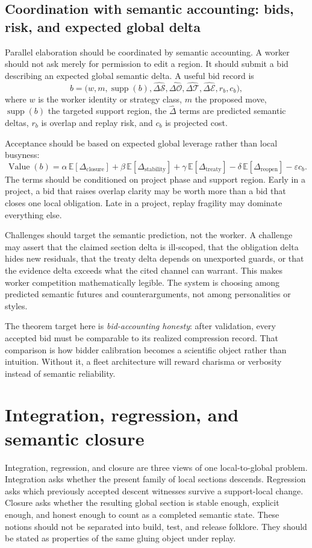 \documentclass[11pt]{report}
\begin{document}
\section{Coordination with semantic accounting: bids, risk, and expected global delta}
Parallel elaboration should be coordinated by semantic accounting. A worker should not ask merely for permission to edit a region. It should submit a bid describing an expected global semantic delta. A useful bid record is
\[
b
=
\bigl(
w,
m,
\operatorname{supp}(b),
\widehat{\Delta \mathcal{S}},
\widehat{\Delta \mathcal{O}},
\widehat{\Delta \mathcal{T}},
\widehat{\Delta \mathcal{E}},
r_b,
c_b
\bigr),
\]
where $w$ is the worker identity or strategy class, $m$ the proposed move, $\operatorname{supp}(b)$ the targeted support region, the $\widehat{\Delta}$ terms are predicted semantic deltas, $r_b$ is overlap and replay risk, and $c_b$ is projected cost.

Acceptance should be based on expected global leverage rather than local busyness:
\[
\operatorname{Value}(b)
=
\alpha \,\mathbb{E}[\Delta_{\mathrm{closure}}]
+
\beta \,\mathbb{E}[\Delta_{\mathrm{stability}}]
+
\gamma \,\mathbb{E}[\Delta_{\mathrm{treaty}}]
-
\delta \,\mathbb{E}[\Delta_{\mathrm{reopen}}]
-
\varepsilon c_b.
\]
The terms should be conditioned on project phase and support region. Early in a project, a bid that raises overlap clarity may be worth more than a bid that closes one local obligation. Late in a project, replay fragility may dominate everything else.

Challenges should target the semantic prediction, not the worker. A challenge may assert that the claimed section delta is ill-scoped, that the obligation delta hides new residuals, that the treaty delta depends on unexported guards, or that the evidence delta exceeds what the cited channel can warrant. This makes worker competition mathematically legible. The system is choosing among predicted semantic futures and counterarguments, not among personalities or styles.

The theorem target here is \emph{bid-accounting honesty}: after validation, every accepted bid must be comparable to its realized compression record. That comparison is how bidder calibration becomes a scientific object rather than intuition. Without it, a fleet architecture will reward charisma or verbosity instead of semantic reliability.

\chapter{Integration, regression, and semantic closure}
Integration, regression, and closure are three views of one local-to-global problem. Integration asks whether the present family of local sections descends. Regression asks which previously accepted descent witnesses survive a support-local change. Closure asks whether the resulting global section is stable enough, explicit enough, and honest enough to count as a completed semantic state. These notions should not be separated into build, test, and release folklore. They should be stated as properties of the same gluing object under replay.
\end{document}
